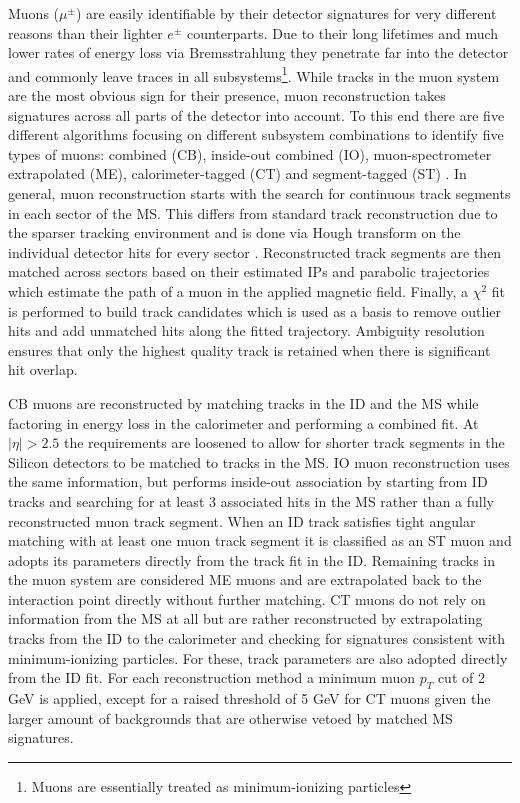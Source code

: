 Muons ($\mu^{\pm}$) are easily identifiable by their detector signatures for very different reasons than their lighter 
$e^{\pm}$ counterparts. Due to their long lifetimes and much lower rates of energy loss via Bremsstrahlung they penetrate 
far into the detector and commonly leave traces in all subsystems\footnote{Muons are essentially treated as minimum-ionizing 
particles}. While tracks in the muon system are the most obvious sign for their presence, muon reconstruction takes 
signatures across all parts of the detector into account. To this end there are five different algorithms focusing on 
different subsystem combinations to identify five types of muons: combined (CB), inside-out combined (IO), muon-spectrometer 
extrapolated (ME), calorimeter-tagged (CT) and segment-tagged (ST) \cite{atlas-muons}. In general, muon reconstruction starts 
with the search for continuous track segments in each sector of the MS. This differs from standard track reconstruction due 
to the sparser tracking environment and is done via Hough transform on the individual detector hits for every sector 
\cite{illingworth-hough-transform}. Reconstructed track segments are then matched across sectors based on their estimated 
IPs and parabolic trajectories which estimate the path of a muon in the applied magnetic field. Finally, a $\chi^2$ fit is 
performed to build track candidates which is used as a basis to remove outlier hits and add unmatched hits along the fitted 
trajectory. Ambiguity resolution ensures that only the highest quality track is retained when there is significant hit 
overlap. \par

CB muons are reconstructed by matching tracks in the ID and the MS while factoring in energy loss in the calorimeter and 
performing a combined fit. At $|\eta| > 2.5$ the requirements are loosened to allow for shorter track segments in the Silicon 
detectors to be matched to tracks in the MS. IO muon reconstruction uses the same information, but performs inside-out 
association by starting from ID tracks and searching for at least 3 associated hits in the MS rather than a fully reconstructed 
muon track segment. When an ID track satisfies tight angular matching with at least one muon track segment it is classified as 
an ST muon and adopts its parameters directly from the track fit in the ID. Remaining tracks in the muon system are considered 
ME muons and are extrapolated back to the interaction point directly without further matching. CT muons do not rely on 
information from the MS at all but are rather reconstructed by extrapolating tracks from the ID to the calorimeter and checking 
for signatures consistent with minimum-ionizing particles. For these, track parameters are also adopted directly from the ID fit. 
For each reconstruction method a minimum muon $p_T$ cut of 2 GeV is applied, except for a raised threshold of 5 GeV for CT muons 
given the larger amount of backgrounds that are otherwise vetoed by matched MS signatures. \par

